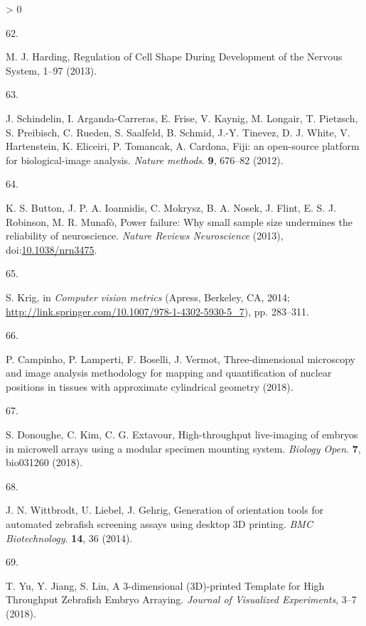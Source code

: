 \documentclass[10pt, b5paper, singlespacinge, twoside]{reedthesis} %
\newlength{\cslhangindent}
\newlength{\csllabelwidth}
\newenvironment{CSLReferences}[3] %
  {%
    \setlength{\parindent}{0pt}
    \ifodd #1 \everypar{\setlength{\hangindent}{\cslhangindent}}\ignorespaces\fi
    \ifnum #2 > 0
    \setlength{\parskip}{#2\baselineskip}
    \fi
  }%
  {}
\newcommand{\CSLLeftMargin}[1]{\parbox[t]{\maxof{\widthof{#1}}{\csllabelwidth}}{#1}}
\newcommand{\CSLRightInline}[1]{\parbox[t]{\linewidth}{#1}}
\theoremstyle{definition}
\theoremstyle{definition}
\theoremstyle{definition}
\theoremstyle{remark}
\begin{document}
\begin{CSLReferences}{0}{0}
\leavevmode\hypertarget{ref-Harding2013}{}%
\CSLLeftMargin{62. }
\CSLRightInline{M. J. Harding, {Regulation of Cell Shape During Development of the Nervous System}, 1--97 (2013).}

\leavevmode\hypertarget{ref-Schindelin2012}{}%
\CSLLeftMargin{63. }
\CSLRightInline{J. Schindelin, I. Arganda-Carreras, E. Frise, V. Kaynig, M. Longair, T. Pietzsch, S. Preibisch, C. Rueden, S. Saalfeld, B. Schmid, J.-Y. Tinevez, D. J. White, V. Hartenstein, K. Eliceiri, P. Tomancak, A. Cardona, {Fiji: an open-source platform for biological-image analysis.} \emph{Nature methods}. \textbf{9}, 676--82 (2012).}

\leavevmode\hypertarget{ref-Button2013}{}%
\CSLLeftMargin{64. }
\CSLRightInline{K. S. Button, J. P. A. Ioannidis, C. Mokrysz, B. A. Nosek, J. Flint, E. S. J. Robinson, M. R. Munafò, {Power failure: Why small sample size undermines the reliability of neuroscience}. \emph{Nature Reviews Neuroscience} (2013), doi:\href{https://doi.org/10.1038/nrn3475}{10.1038/nrn3475}.}

\leavevmode\hypertarget{ref-Krig2014}{}%
\CSLLeftMargin{65. }
\CSLRightInline{S. Krig, in \emph{Computer vision metrics} (Apress, Berkeley, CA, 2014; \url{http://link.springer.com/10.1007/978-1-4302-5930-5_7}), pp. 283--311.}

\leavevmode\hypertarget{ref-Campinho2018}{}%
\CSLLeftMargin{66. }
\CSLRightInline{P. Campinho, P. Lamperti, F. Boselli, J. Vermot, {Three-dimensional microscopy and image analysis methodology for mapping and quantification of nuclear positions in tissues with approximate cylindrical geometry} (2018).}

\leavevmode\hypertarget{ref-Donoughe2018}{}%
\CSLLeftMargin{67. }
\CSLRightInline{S. Donoughe, C. Kim, C. G. Extavour, {High-throughput live-imaging of embryos in microwell arrays using a modular specimen mounting system}. \emph{Biology Open}. \textbf{7}, bio031260 (2018).}

\leavevmode\hypertarget{ref-Wittbrodt2014}{}%
\CSLLeftMargin{68. }
\CSLRightInline{J. N. Wittbrodt, U. Liebel, J. Gehrig, {Generation of orientation tools for automated zebrafish screening assays using desktop 3D printing}. \emph{BMC Biotechnology}. \textbf{14}, 36 (2014).}

\leavevmode\hypertarget{ref-Yu2018}{}%
\CSLLeftMargin{69. }
\CSLRightInline{T. Yu, Y. Jiang, S. Lin, {A 3-dimensional (3D)-printed Template for High Throughput Zebrafish Embryo Arraying}. \emph{Journal of Visualized Experiments}, 3--7 (2018).}


\end{CSLReferences}
\end{document}
